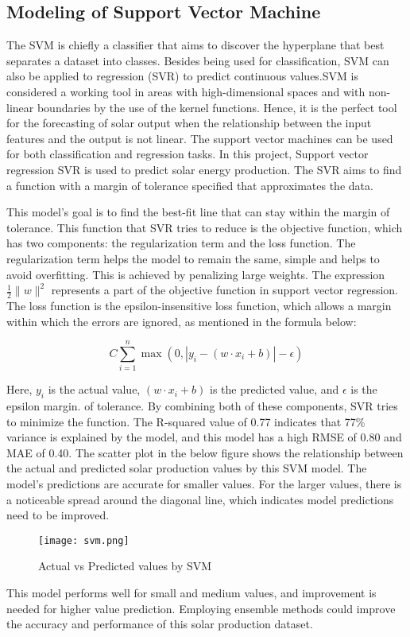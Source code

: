 \documentclass[conference]{IEEEtran}
\begin{document}
\subsection{Modeling of Support Vector Machine}
The SVM is chiefly a classifier that aims to discover the hyperplane that best separates a dataset into classes. Besides being used for classification, SVM can also be applied to regression (SVR) to predict continuous values.SVM is considered a working tool in areas with high-dimensional spaces and with non-linear boundaries by the use of the kernel functions. Hence, it is the perfect tool for the forecasting of solar output when the relationship between the input features and the output is not linear. The support vector machines can be used for both classification and regression tasks. In this project, Support vector regression SVR is used to predict solar energy production. The SVR aims to find a function with a margin of tolerance specified that approximates the data.

This model's goal is to find the best-fit line that can stay within the margin of tolerance. This function that SVR tries to reduce is the objective function, which has two components: the regularization term and the loss function. The regularization term helps the model to remain the same, simple and helps to avoid overfitting. This is achieved by penalizing large weights.
The expression \(\frac{1}{2} \|w\|^2\) represents a part of the objective function in support vector regression. The loss function is the epsilon-insensitive loss function, which allows a margin within which the errors are ignored, as mentioned in the formula below:

\[
C \sum_{i=1}^{n} \max(0, |y_i - (w \cdot x_i + b)| - \epsilon)
\]

Here, \(y_i\) is the actual value, \((w \cdot x_i + b)\) is the predicted value, and \(\epsilon\) is the epsilon margin. of tolerance. By combining both of these components, SVR tries to minimize the function. The R-squared value of 0.77 indicates that 77\% variance is explained by the model, and this model has a high RMSE of 0.80 and MAE of 0.40. The scatter plot in the below figure shows the relationship between the actual and predicted solar production values by this SVM model. The model’s predictions are accurate for smaller values. For the larger values, there is a noticeable spread around the diagonal line, which indicates model predictions need to be improved.
\begin{figure}[H] %
    \centering
    \texttt{[image: svm.png]}
    \caption{Actual vs Predicted values by SVM}
    \label{fig: Actual vs Predicted values by SVM}
\end{figure}
This model performs well for small and medium values, and improvement is needed for higher value prediction. Employing ensemble methods could improve the accuracy and performance of this solar production dataset.
\end{document}
